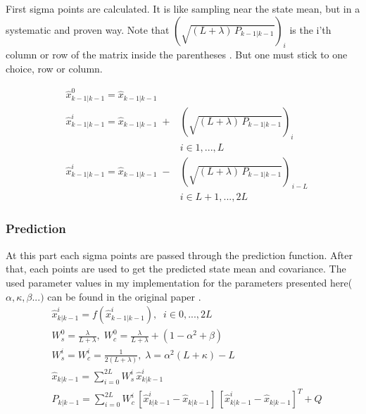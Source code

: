 \documentclass[peerreview]{IEEEtran}
\begin{document}
First sigma points are calculated. It is like sampling near the state mean, but in a systematic and proven way. Note that $ (\sqrt{(L+\lambda) \, P_{k-1|k-1}})_i $ is the i'th column or row of the matrix inside the parentheses \cite{UKFT}. But one must stick to one choice, row or column.

\begin{equation}
\begin{aligned}
&\hat{x}_{k-1|k-1}^0 = \hat{x}_{k-1|k-1} \\
&\hat{x}_{k-1|k-1}^i = \hat{x}_{k-1|k-1} \; + &(\sqrt{(L+\lambda) \, P_{k-1|k-1}})_i  \\
& &i\in 1,...,L\\
&\hat{x}_{k-1|k-1}^i = \hat{x}_{k-1|k-1} \; - &(\sqrt{(L+\lambda) \, P_{k-1|k-1}})_{\,i-L} \\
& &i\in L+1,...,2L 
\end{aligned}
\end{equation}

\subsubsection{Prediction}
At this part each sigma points are passed through the prediction function. After that, each points are used to get the predicted state mean and covariance. The used parameter values in my implementation for the parameters presented here($\alpha, \kappa, \beta ...)$ can be found in the original paper \cite{MERWE00}.
\vspace{10px}
\begin{equation}
\begin{aligned}
&\hat{x}_{k|k-1}^i = f(\hat{x}_{k-1|k-1}^i),  \; \; i\in 0,...,2L\\
&W_s^0 = \frac{\lambda}{L + \lambda}, \; W_c^0 = \frac{\lambda}{L+\lambda} + (1-\alpha^2 + \beta)\\
&W_s^i = W_c^i = \frac{1}{2(L+\lambda)}, \; \lambda = \alpha^2 (L+\kappa) - L \\
&\hat{x}_{k|k-1} = \sum\limits_{i=0}^{2L} W_s^i \, \hat{x}_{k|k-1}^i \\
&P_{k|k-1} = \sum\limits_{i=0}^{2L} W_c^i \, [\hat{x}_{k|k-1}^i-\hat{x}_{k|k-1}]\,[\hat{x}_{k|k-1}^i-\hat{x}_{k|k-1}]^T + Q 
\end{aligned}
\end{equation}
\vspace{10px}
\end{document}
